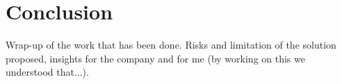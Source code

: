 \chapter{Conclusion}
\label{cha:conclusion}
Wrap-up of the work that has been done. Risks and limitation of the solution proposed, insights for the company and for me (by working on this we understood that...).

